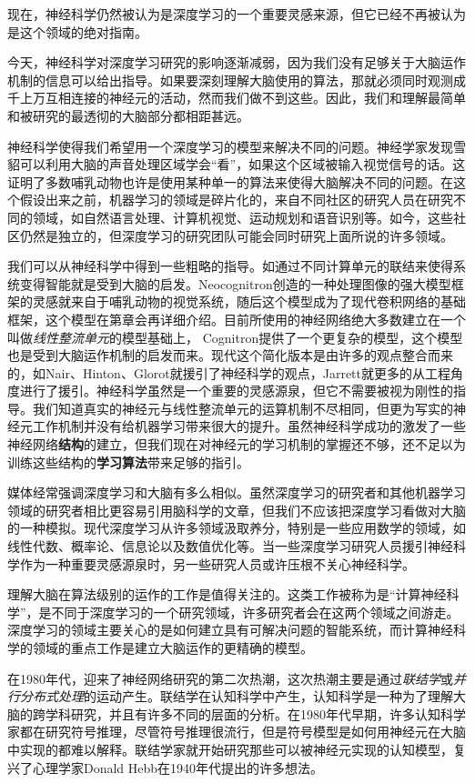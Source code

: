 \documentclass[a4paper,11pt]{book}
\begin{document}
现在，神经科学仍然被认为是深度学习的一个重要灵感来源，但它已经不再被认为是这个领域的绝对指南。


今天，神经科学对深度学习研究的影响逐渐减弱，因为我们没有足够关于大脑运作机制的信息可以给出指导。如果要深刻理解大脑使用的算法，那就必须同时观测成千上万互相连接的神经元的活动，然而我们做不到这些。因此，我们和理解最简单和被研究的最透彻的大脑部分都相距甚远。


神经科学使得我们希望用一个深度学习的模型来解决不同的问题。神经学家发现雪貂可以利用大脑的声音处理区域学会“看”，如果这个区域被输入视觉信号的话。这证明了多数哺乳动物也许是使用某种单一的算法来使得大脑解决不同的问题。在这个假设出来之前，机器学习的领域是碎片化的，来自不同社区的研究人员在研究不同的领域，如自然语言处理、计算机视觉、运动规划和语音识别等。如今，这些社区仍然是独立的，但深度学习的研究团队可能会同时研究上面所说的许多领域。


我们可以从神经科学中得到一些粗略的指导。如通过不同计算单元的联结来使得系统变得智能就是受到大脑的启发。Neocognitron创造的一种处理图像的强大模型框架的灵感就来自于哺乳动物的视觉系统，随后这个模型成为了现代卷积网络的基础框架，这个模型在第章会再详细介绍。目前所使用的神经网络绝大多数建立在一个叫做\emph{线性整流单元}的模型基础上， Cognitron提供了一个更复杂的模型，这个模型也是受到大脑运作机制的启发而来。现代这个简化版本是由许多的观点整合而来的，如Nair、Hinton、Glorot就援引了神经科学的观点，Jarrett就更多的从工程角度进行了援引。神经科学虽然是一个重要的灵感源泉，但它不需要被视为刚性的指导。我们知道真实的神经元与线性整流单元的运算机制不尽相同，但更为写实的神经元工作机制并没有给机器学习带来很大的提升。虽然神经科学成功的激发了一些神经网络\textbf{结构}的建立，但我们现在对神经元的学习机制的掌握还不够，还不足以为训练这些结构的\textbf{学习算法}带来足够的指引。


媒体经常强调深度学习和大脑有多么相似。虽然深度学习的研究者和其他机器学习领域的研究者相比更容易引用脑科学的文章，但我们不应该把深度学习看做对大脑的一种模拟。现代深度学习从许多领域汲取养分，特别是一些应用数学的领域，如线性代数、概率论、信息论以及数值优化等。当一些深度学习研究人员援引神经科学作为一种重要灵感源泉时，另一些研究人员或许压根不关心神经科学。


理解大脑在算法级别的运作的工作是值得关注的。这类工作被称为是“计算神经科学”，是不同于深度学习的一个研究领域，许多研究者会在这两个领域之间游走。深度学习的领域主要关心的是如何建立具有可解决问题的智能系统，而计算神经科学的领域的重点工作是建立大脑运作的更精确的模型。


在1980年代，迎来了神经网络研究的第二次热潮，这次热潮主要是通过\emph{联结学}或\emph{并行分布式处理}的运动产生。联结学在认知科学中产生，认知科学是一种为了理解大脑的跨学科研究，并且有许多不同的层面的分析。在1980年代早期，许多认知科学家都在研究符号推理，尽管符号推理很流行，但是符号模型是如何用神经元在大脑中实现的都难以解释。联结学家就开始研究那些可以被神经元实现的认知模型，复兴了心理学家Donald Hebb在1940年代提出的许多想法。
\end{document}
